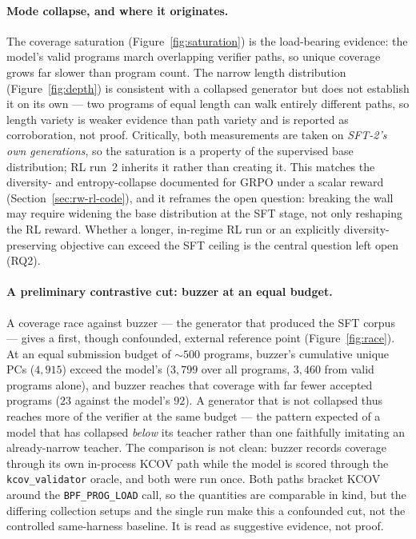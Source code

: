 \paragraph{Mode collapse, and where it originates.}
The coverage saturation (Figure~\ref{fig:saturation}) is the load-bearing evidence:
the model's valid programs march overlapping verifier paths, so unique coverage
grows far slower than program count. The narrow length distribution
(Figure~\ref{fig:depth}) is consistent with a collapsed generator but does not
establish it on its own --- two programs of equal length can walk entirely
different paths, so length variety is weaker evidence than path variety and is
reported as corroboration, not proof. Critically, both measurements are taken on
\emph{SFT-2's own generations}, so the saturation is a property of the supervised
base distribution; RL run~2 inherits it rather than creating it. This matches the
diversity- and entropy-collapse documented for GRPO under a scalar reward
(Section~\ref{sec:rw-rl-code}), and it reframes the open question: breaking the wall
may require widening the base distribution at the SFT stage, not only reshaping the
RL reward. Whether a longer, in-regime RL run or an explicitly diversity-preserving
objective can exceed the SFT ceiling is the central question left open (RQ2).

\paragraph{A preliminary contrastive cut: buzzer at an equal budget.}
A coverage race against buzzer --- the generator that produced the SFT corpus ---
gives a first, though confounded, external reference point
(Figure~\ref{fig:race}). At an equal submission budget of ${\sim}500$ programs,
buzzer's cumulative unique PCs ($4{,}915$) exceed the model's ($3{,}799$ over all
programs, $3{,}460$ from valid programs alone), and buzzer reaches that coverage with
far fewer accepted programs ($23$ against the model's $92$). A generator that is not
collapsed thus reaches more of the verifier at the same budget --- the pattern
expected of a model that has collapsed \emph{below} its teacher rather than one
faithfully imitating an already-narrow teacher. The comparison is not clean: buzzer
records coverage through its own in-process KCOV path while the model is scored
through the \texttt{kcov\_validator} oracle, and both were run once. Both paths
bracket KCOV around the \texttt{BPF\_PROG\_LOAD} call, so the quantities are
comparable in kind, but the differing collection setups and the single run make this
a confounded cut, not the controlled same-harness baseline. It is read as suggestive
evidence, not proof.

